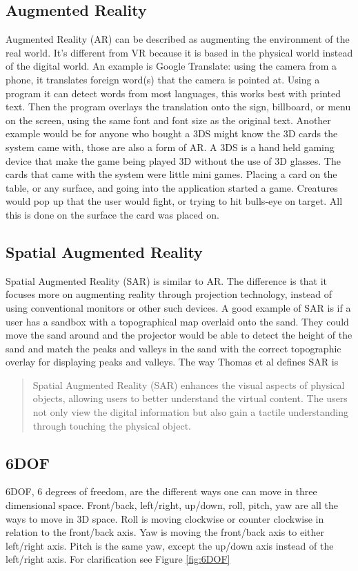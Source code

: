 \documentclass{sig-alternate}
\begin{document}
\subsection{Augmented Reality}
\label{sec:Augmented Reality}
Augmented Reality (AR) can be described as augmenting the environment of the real world. It's different from VR because it is based in the physical world instead of the digital world. An example is Google Translate: using the camera from a phone, it translates foreign word(s) that the camera is pointed at. Using a program it can detect words from most languages, this works best with printed text. Then the program overlays the translation onto the sign, billboard, or menu on the screen, using the same font and font size as the original text. Another example would be for anyone who bought a 3DS might know the 3D cards the system came with, those are also a form of AR. A 3DS is a hand held gaming device that make the game being played 3D without the use of 3D glasses. The cards that came with the system were little mini games. Placing a card on the table, or any surface, and going into the application started a game. Creatures would pop up that the user would fight, or trying to hit bulls-eye on target. All this is done on the surface the card was placed on.   

\subsection{Spatial Augmented Reality}
\label{sec:Spatial Augmented Reality}
Spatial Augmented Reality (SAR) is similar to AR. The difference is that it focuses more on augmenting reality through projection technology, instead of using conventional monitors or other such devices. A good example of SAR is if a user has a sandbox with a topographical map overlaid onto the sand. They could move the sand around and the projector would be able to detect the height of the sand and match the peaks and valleys in the sand with the correct topographic overlay for displaying peaks and valleys. The way Thomas et al \cite{3D} defines SAR is 
\begin{quote}
Spatial Augmented Reality (SAR) enhances the visual aspects of physical objects, allowing users to better understand the virtual content. The users not only view the digital information but also gain a tactile understanding through touching the physical object.
\end{quote}

\subsection{6DOF}
\label{sec:6DOF}
6DOF, 6 degrees of freedom, are the different ways one can move in three dimensional space. Front/back, left/right, up/down, roll, pitch, yaw are all the ways to move in 3D space. Roll is moving clockwise or counter clockwise in relation to the front/back axis. Yaw is moving the front/back axis to either left/right axis. Pitch is the same yaw, except the up/down axis instead of the left/right axis. For clarification see Figure \ref{fig:6DOF}
\end{document}
